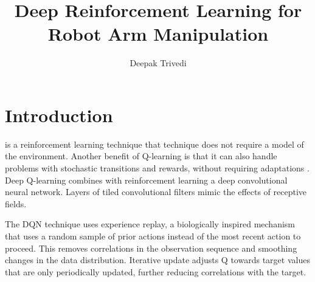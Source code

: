 \documentclass[10pt,journal,compsoc]{IEEEtran}
\begin{document}
\title{Deep Reinforcement Learning for Robot Arm Manipulation}

\author{Deepak Trivedi}

%
{}


\maketitle
\IEEEdisplaynontitleabstractindextext
\IEEEpeerreviewmaketitle
\section{Introduction}
\label{sec:introduction}


 is a reinforcement learning technique that technique does not require a model of the environment. Another benefit of Q-learning is that it can also handle problems with stochastic transitions and rewards, without requiring adaptations \cite{WikipediaQlearning}. Deep Q-learning combines with reinforcement learning a deep convolutional neural network. Layers of tiled convolutional filters mimic the effects of receptive fields. 

The DQN technique uses experience replay, a biologically inspired mechanism that uses a random sample of prior actions instead of the most recent action to proceed. This removes correlations in the observation sequence and smoothing changes in the data distribution. Iterative update adjusts Q towards target values that are only periodically updated, further reducing correlations with the target. \cite{WikipediaQlearning}
\end{document}
